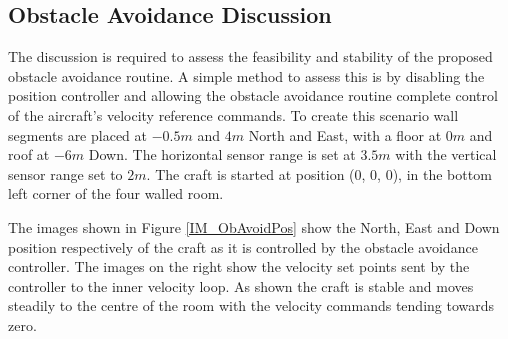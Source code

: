 				
		\subsection{Obstacle Avoidance Discussion}
		The discussion is required to assess the feasibility and stability of the proposed obstacle avoidance routine. A simple method to assess this is by disabling the position controller and allowing the obstacle avoidance routine complete control of the aircraft's velocity reference commands. To create this scenario wall segments are placed at $-0.5m$ and $4m$ North and East, with a floor at $0m$ and roof at $-6m$ Down. The horizontal sensor range is set at $3.5m$ with the vertical sensor range set to $2m$. The craft is started at position (0, 0, 0), in the bottom left corner of the four walled room.
		
		The images shown in Figure \ref{IM_ObAvoidPos} show the North, East and Down position respectively of the craft as it is controlled by the obstacle avoidance controller. The images on the right show the velocity set points sent by the controller to the inner velocity loop. As shown the craft is stable and moves steadily to the centre of the room with the velocity commands tending towards zero. 
		
